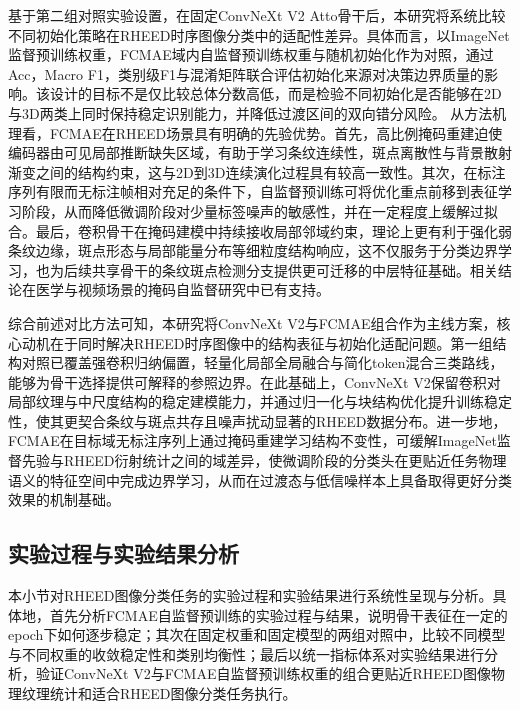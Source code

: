 基于第二组对照实验设置，在固定ConvNeXt V2 Atto骨干后，本研究将系统比较不同初始化策略在RHEED时序图像分类中的适配性差异。具体而言，以ImageNet监督预训练权重，FCMAE域内自监督预训练权重与随机初始化作为对照，通过Acc，Macro F1，类别级F1与混淆矩阵联合评估初始化来源对决策边界质量的影响。该设计的目标不是仅比较总体分数高低，而是检验不同初始化是否能够在2D与3D两类上同时保持稳定识别能力，并降低过渡区间的双向错分风险。
从方法机理看，FCMAE在RHEED场景具有明确的先验优势。首先，高比例掩码重建迫使编码器由可见局部推断缺失区域，有助于学习条纹连续性，斑点离散性与背景散射渐变之间的结构约束，这与2D到3D连续演化过程具有较高一致性。其次，在标注序列有限而无标注帧相对充足的条件下，自监督预训练可将优化重点前移到表征学习阶段，从而降低微调阶段对少量标签噪声的敏感性，并在一定程度上缓解过拟合。最后，卷积骨干在掩码建模中持续接收局部邻域约束，理论上更有利于强化弱条纹边缘，斑点形态与局部能量分布等细粒度结构响应，这不仅服务于分类边界学习，也为后续共享骨干的条纹斑点检测分支提供更可迁移的中层特征基础。相关结论在医学与视频场景的掩码自监督研究中已有支持。

综合前述对比方法可知，本研究将ConvNeXt V2与FCMAE组合作为主线方案，核心动机在于同时解决RHEED时序图像中的结构表征与初始化适配问题。第一组结构对照已覆盖强卷积归纳偏置，轻量化局部全局融合与简化token混合三类路线，能够为骨干选择提供可解释的参照边界。在此基础上，ConvNeXt V2保留卷积对局部纹理与中尺度结构的稳定建模能力，并通过归一化与块结构优化提升训练稳定性，使其更契合条纹与斑点共存且噪声扰动显著的RHEED数据分布。进一步地，FCMAE在目标域无标注序列上通过掩码重建学习结构不变性，可缓解ImageNet监督先验与RHEED衍射统计之间的域差异，使微调阶段的分类头在更贴近任务物理语义的特征空间中完成边界学习，从而在过渡态与低信噪样本上具备取得更好分类效果的机制基础。


\subsection{实验过程与实验结果分析}
\label{subsec:cp2_results}

本小节对RHEED图像分类任务的实验过程和实验结果进行系统性呈现与分析。具体地，首先分析FCMAE自监督预训练的实验过程与结果，说明骨干表征在一定的epoch下如何逐步稳定；其次在固定权重和固定模型的两组对照中，比较不同模型与不同权重的收敛稳定性和类别均衡性；最后以统一指标体系对实验结果进行分析，验证ConvNeXt V2与FCMAE自监督预训练权重的组合更贴近RHEED图像物理纹理统计和适合RHEED图像分类任务执行。

